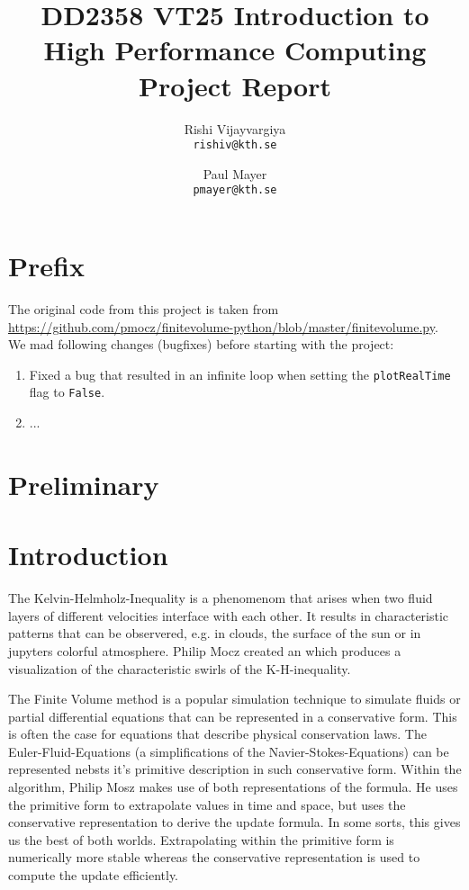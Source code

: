 \documentclass[a4paper,12pt]{article}
\title{
  \normalsize{DD2358 VT25 Introduction to}\\
  \normalsize{High Performance Computing}\\
  \large{Project Report}
}
\author{
  \small Rishi Vijayvargiya\\[-0.75ex]
  \scriptsize\texttt{rishiv@kth.se}
  \and
  \small Paul Mayer\\[-0.75ex]
  \scriptsize\texttt{pmayer@kth.se}
}
\date{}
\begin{document}
\maketitle
\thispagestyle{firstpagestyle}

\listoftodos

\vspace{1em}

%

\section*{Prefix}
The original code from this project is taken from \url{https://github.com/pmocz/finitevolume-python/blob/master/finitevolume.py}.\\
We mad following changes (bugfixes) before starting with the project:

\begin{enumerate}
  \item Fixed a bug that resulted in an infinite loop when setting the \verb|plotRealTime| flag to \verb|False|.
  \item ...
\end{enumerate}

\section*{Preliminary}
\section{Introduction}
The Kelvin-Helmholz-Inequality is a phenomenom that arises when two fluid layers of different velocities interface with each other.
It results in characteristic patterns that can be observered, e.g. in clouds, the surface of the sun or in jupyters colorful atmosphere.
Philip Mocz created an which produces a visualization of the characteristic swirls of the K-H-inequality.

The Finite Volume method is a popular simulation technique to simulate fluids or partial differential equations that can be represented in a conservative form.
This is often the case for equations that describe physical conservation laws.
The Euler-Fluid-Equations (a simplifications of the Navier-Stokes-Equations) can be represented nebsts it's primitive description in such conservative form.
Within the algorithm, Philip Mosz makes use of both representations of the formula.
He uses the primitive form to extrapolate values in time and space, but uses the conservative representation to derive the update formula.
In some sorts, this gives us the best of both worlds.
Extrapolating within the primitive form is numerically more stable whereas the conservative representation is used to compute the update efficiently.
\end{document}
